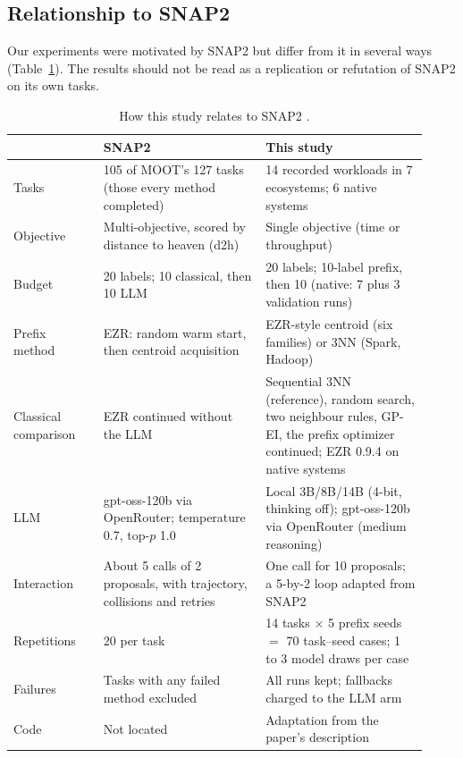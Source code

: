 \subsection{Relationship to SNAP2}

Our experiments were motivated by SNAP2 but differ from it in several ways (Table~\ref{tab:snap2}). The results should not be read as a replication or refutation of SNAP2 on its own tasks.

\begin{table}[t]
\centering
\caption{How this study relates to SNAP2 \cite{srinivasan2026snap2}.}
\label{tab:snap2}
\small
\begin{tabular}{p{0.2\linewidth}p{0.36\linewidth}p{0.36\linewidth}}
\toprule
 & SNAP2 & This study \\
\midrule
Tasks & 105 of MOOT's 127 tasks (those every method completed) & 14 recorded workloads in 7 ecosystems; 6 native systems \\
Objective & Multi-objective, scored by distance to heaven (d2h) & Single objective (time or throughput) \\
Budget & 20 labels; 10 classical, then 10 LLM & 20 labels; 10-label prefix, then 10 (native: 7 plus 3 validation runs) \\
Prefix method & EZR: random warm start, then centroid acquisition & EZR-style centroid (six families) or 3NN (Spark, Hadoop) \\
Classical comparison & EZR continued without the LLM & Sequential 3NN (reference), random search, two neighbour rules, GP-EI, the prefix optimizer continued; EZR 0.9.4 on native systems \\
LLM & gpt-oss-120b via OpenRouter; temperature 0.7, top-$p$ 1.0 & Local 3B/8B/14B (4-bit, thinking off); gpt-oss-120b via OpenRouter (medium reasoning) \\
Interaction & About 5 calls of 2 proposals, with trajectory, collisions and retries & One call for 10 proposals; a 5-by-2 loop adapted from SNAP2 \\
Repetitions & 20 per task & 14 tasks $\times$ 5 prefix seeds $=$ 70 task--seed cases; 1 to 3 model draws per case \\
Failures & Tasks with any failed method excluded & All runs kept; fallbacks charged to the LLM arm \\
Code & Not located & Adaptation from the paper's description \\
\bottomrule
\end{tabular}
\end{table}

